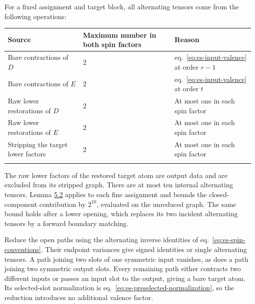 \documentclass[
  english,
  11pt,
  reqno]{amsart}
\begin{document}
For a fixed assignment and target block, all alternating tensors come
from the following operations:

\begin{center}
\begin{tabular}{@{}
  >{\raggedright\arraybackslash}p{}
  >{\raggedright\arraybackslash}p{}
  >{\raggedright\arraybackslash}p{}@{}}
\toprule\noalign{}
\begin{minipage}[b]{\linewidth}\raggedright
Source
\end{minipage} & \begin{minipage}[b]{\linewidth}\raggedright
Maximum number in both spin factors
\end{minipage} & \begin{minipage}[b]{\linewidth}\raggedright
Reason
\end{minipage} \\
\midrule\noalign{}
Bare contractions of \(D\) & \(2\) & eq.~\ref{eq:es-input-valence} at
order \(r-1\) \\
Bare contractions of \(E\) & \(2\) & eq.~\ref{eq:es-input-valence} at
order \(t\) \\
Raw lower restorations of \(D\) & \(2\) & At most one in each spin
factor \\
Raw lower restorations of \(E\) & \(2\) & At most one in each spin
factor \\
Stripping the target lower factors & \(2\) & At most one in each spin
factor \\
\bottomrule\noalign{}
\end{tabular}
\end{center}

The raw lower factors of the restored target atom are output data and
are excluded from its stripped graph. There are at most ten internal
alternating tensors. Lemma \hyperref[lem:es-directed-wires]{5.2} applies
to each fine assignment and bounds the closed-component contribution by
\(2^{10}\), evaluated on the unreduced graph. The same bound holds after
a lower opening, which replaces its two incident alternating tensors by
a forward boundary matching.

Reduce the open paths using the alternating inverse identities of
eq.~\ref{eq:es-spin-conventions}. Their endpoint variances give signed
identities or single alternating tensors. A path joining two slots of
one symmetric input vanishes, as does a path joining two symmetric
output slots. Every remaining path either contracts two different inputs
or passes an input slot to the output, giving a bare target atom. Its
selected-slot normalization is
eq.~\ref{eq:es-preselected-normalization}, so the reduction introduces
no additional valence factor.
\end{document}
